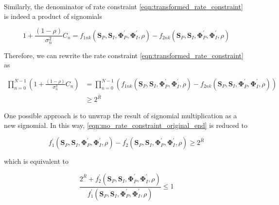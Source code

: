 Similarly, the denominator of rate constraint \eqref{eqn:transformed_rate_constraint} is indeed a product of signomials

\begin{equation}\label{eqn:mo_rate_signomial}
  1 + \frac{{(1 - \rho )}}{{\sigma _n^2}}{C_n} = {f_{1nk}}\left( {{{\mathbf{S}}_P},{{\mathbf{S}}_I},{\mathbf{\Phi }}_P^\prime ,{\mathbf{\Phi }}_I^\prime ,\rho } \right) - {f_{2nk}}\left( {{{\mathbf{S}}_P},{{\mathbf{S}}_I},{\mathbf{\Phi }}_P^\prime ,{\mathbf{\Phi }}_I^\prime ,\rho } \right)
\end{equation}

Therefore, we can rewrite the rate constraint \eqref{eqn:transformed_rate_constraint} as

\begin{align}\label{eqn:mo_rate_constraint_original}
  \prod\limits_{n = 0}^{N - 1} {\left( {1 + \frac{{(1 - \rho )}}{{\sigma _n^2}}{C_n}} \right)}  &= \prod\limits_{n = 0}^{N - 1} {\left( {{f_{1nk}}\left( {{{\mathbf{S}}_P},{{\mathbf{S}}_I},{\mathbf{\Phi }}_P^\prime ,{\mathbf{\Phi }}_I^\prime ,\rho } \right) - {f_{2nk}}\left( {{{\mathbf{S}}_P},{{\mathbf{S}}_I},{\mathbf{\Phi }}_P^\prime ,{\mathbf{\Phi }}_I^\prime ,\rho } \right)} \right)}  \\
  &\geqslant {2^{\bar R}} \label{eqn:mo_rate_constraint_original_end}
\end{align}

One possible approach is to unwrap the result of signomial multiplication as a new signomial. In this way, \ref{eqn:mo_rate_constraint_original_end} is reduced to

\begin{equation}\label{eqn:mo_rate_constraint_unwrapped}
  f_1^\prime \left( {{{\mathbf{S}}_P},{{\mathbf{S}}_I},{\mathbf{\Phi }}_P^\prime ,{\mathbf{\Phi }}_I^\prime ,\rho } \right) - f_2^\prime \left( {{{\mathbf{S}}_P},{{\mathbf{S}}_I},{\mathbf{\Phi }}_P^\prime ,{\mathbf{\Phi }}_I^\prime ,\rho } \right) \geqslant {2^{\bar R}}
\end{equation}

which is equivalent to

\begin{equation}\label{eqn:mo_rate_constraint_rewritten}
  \frac{{{2^{\bar R}} + f_2^\prime \left( {{{\mathbf{S}}_P},{{\mathbf{S}}_I},{\mathbf{\Phi }}_P^\prime ,{\mathbf{\Phi }}_I^\prime ,\rho } \right)}}{{f_1^\prime \left( {{{\mathbf{S}}_P},{{\mathbf{S}}_I},{\mathbf{\Phi }}_P^\prime ,{\mathbf{\Phi }}_I^\prime ,\rho } \right)}} \leqslant 1
\end{equation}

